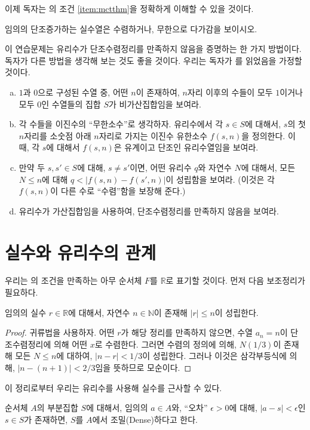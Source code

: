 이제 독자는 의 조건 \ref{item:mctthm}을 정확하게 이해할 수 있을 것이다.
\begin{exercise}
    임의의 단조증가하는 실수열은 수렴하거나, 무한으로 다가감을 보이시오.
\end{exercise}
\begin{exercise}
    이 연습문제는 유리수가 단조수렴정리를 만족하지 않음을 증명하는 한 가지 방법이다.
    독자가 다른 방법을 생각해 보는 것도 좋을 것이다.
    우리는 독자가 를 읽었음을 가정할 것이다.
    \begin{enumerate}[(a)]
        \item $1$과 $0$으로 구성된 수열 중, 어떤 $n$이 존재하여, $n$자리 이후의 수들이 모두 $1$이거나 모두 $0$인 수열들의 집합 $S$가 비가산집합임을 보여라.
        \item 각 수들을 이진수의 ``무한소수''로 생각하자.
        유리수에서 각 $s \in S$에 대해서, $s$의 첫 $n$자리를 소숫점 아래 $n$자리로 가지는 이진수 유한소수 $f(s, n)$을 정의한다.
        이 때, 각 $s$에 대해서 $f(s, n)$은 유계이고 단조인 유리수열임을 보여라.
        \item 만약 두 $s, s'\in S$에 대해, $s \neq s'$이면, 어떤 유리수 $q$와 자연수 $N$에 대해서, 모든 $N \leq n$에 대해 $q < |f(s, n) - f(s',n)|$이 성립함을 보여라. (이것은 각 $f(s, n)$이 다른 수로 ``수렴''함을 보장해 준다.)
        \item 유리수가 가산집합임을 사용하여, 단조수렴정리를 만족하지 않음을 보여라.
    \end{enumerate}
\end{exercise}

\section{실수와 유리수의 관계}
우리는 의 조건을 만족하는 아무 순서체 $F$를 $\mathbb{R}$로 표기할 것이다.
먼저 다음 보조정리가 필요하다.
\begin{lemma}[Archimedes]
\label{thm:archimedes}
    임의의 실수 $r \in \mathbb{R}$에 대해서, 자연수 $n \in \mathbb{N}$이 존재해 $|r| \leq n$이 성립한다.
\end{lemma}
\begin{proof}
    귀류법을 사용하자.
    어떤 $r$가 해당 정리를 만족하지 않으면, 수열 $a_n = n$이 단조수렴정리에 의해 어떤 $x$로 수렴한다.
    그러면 수렴의 정의에 의해, $N(1/3)$이 존재해 모든 $N \leq n$에 대하여, $|n - r| < 1/3$이 성립한다.
    그러나 이것은 삼각부등식에 의해, $|n - (n + 1)| < 2/3$임을 뜻하므로 모순이다.
\end{proof}
이 정리로부터 우리는 유리수를 사용해 실수를 근사할 수 있다.
\begin{definition}
\label{def:realdense}
    순서체 $A$의 부분집합 $S$에 대해서, 임의의 $a \in A$와, ``오차'' $\epsilon > 0$에 대해, $|a - s| < \epsilon$인 $s \in S$가 존재하면, $S$를 $A$에서 조밀(Dense)하다고 한다.
\end{definition}

